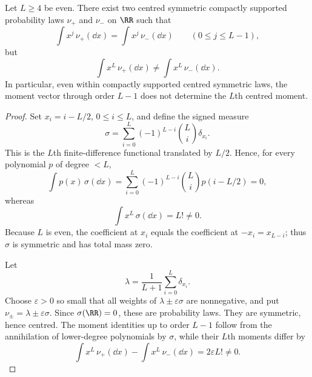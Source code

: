 \begin{lemma}%
\label{lem:lower-moment-realizability-obstruction}
Let \(L\ge4\) be even.  There exist two centred symmetric compactly
supported probability laws \(\nu_+\) and \(\nu_-\) on \(\RR\) such that
\[
  \int x^j\,\nu_+(\dd x)=\int x^j\,\nu_-(\dd x)
  \qquad(0\le j\le L-1),
\]
but
\[
  \int x^L\,\nu_+(\dd x)\ne \int x^L\,\nu_-(\dd x).
\]
In particular, even within compactly supported centred symmetric laws, the
moment vector through order \(L-1\) does not determine the \(L\)th centred
moment.
\end{lemma}

\begin{proof}
Set \(x_i=i-L/2\), \(0\le i\le L\), and define the signed measure
\[
  \sigma=\sum_{i=0}^{L}(-1)^{L-i}\binom{L}{i}\delta_{x_i}.
\]
This is the \(L\)th finite-difference functional translated by \(L/2\).
Hence, for every polynomial \(p\) of degree \(<L\),
\[
  \int p(x)\,\sigma(\dd x)
  =\sum_{i=0}^{L}(-1)^{L-i}\binom{L}{i}p(i-L/2)=0,
\]
whereas
\[
  \int x^L\,\sigma(\dd x)=L!\ne0 .
\]
Because \(L\) is even, the coefficient at \(x_i\) equals the coefficient at
\(-x_i=x_{L-i}\); thus \(\sigma\) is symmetric and has total mass zero.

Let
\[
  \lambda=\frac1{L+1}\sum_{i=0}^{L}\delta_{x_i}.
\]
Choose \(\varepsilon>0\) so small that all weights of
\(\lambda\pm\varepsilon\sigma\) are nonnegative, and put
\(\nu_\pm=\lambda\pm\varepsilon\sigma\).  Since \(\sigma(\RR)=0\), these are
probability laws.  They are symmetric, hence centred.  The moment identities
up to order \(L-1\) follow from the annihilation of lower-degree
polynomials by \(\sigma\), while their \(L\)th moments differ by
\[
  \int x^L\,\nu_+(\dd x)-\int x^L\,\nu_-(\dd x)
  =2\varepsilon L!\ne0 .
\]
\end{proof}


